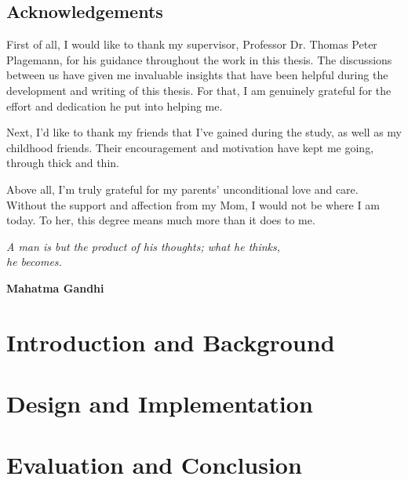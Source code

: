 \documentclass[UKenglish]{ifimaster}  %
\begin{document}
\chapter*{Acknowledgements}
First of all, I would like to thank my supervisor, Professor Dr. Thomas Peter Plagemann, for his guidance throughout the work in this thesis. The discussions between us have given me invaluable insights that have been helpful during the development and writing of this thesis. For that, I am genuinely grateful for the effort and dedication he put into helping me. 

Next, I'd like to thank my friends that I've gained during the study, as well as my childhood friends. Their encouragement and motivation have kept me going, through thick and thin. 

Above all, I'm truly grateful for my parents' unconditional love and care. Without the support and affection from my Mom, I would not be where I am today. To her, this degree means much more than it does to me.

\vspace*{\fill}

\epigraph{\hfill{\textit{A man is but the product of his thoughts; what he thinks, \\he becomes.}}}{\textbf{Mahatma Gandhi}}

\tableofcontents

\listoftables

\listoffigures

\mainmatter{}

\part{Introduction and Background}




\part{Design and Implementation}



\part{Evaluation and Conclusion}




\backmatter{}

\printbibliography


\begin{appendices}

    
\end{appendices}
\end{document}
